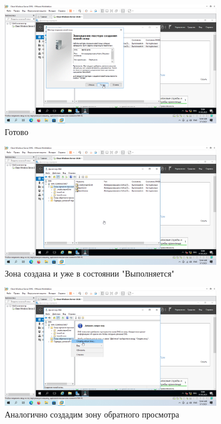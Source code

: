 \documentclass[a4paper]{article}
\begin{document}
  \begin{figure}[H]
    \centering
    \includegraphics[width=0.85\textwidth]{9_0075}
    \caption{Готово}
    \label{img:0075}
  \end{figure}

  \begin{figure}[H]
    \centering
    \includegraphics[width=0.85\textwidth]{9_0076}
    \caption{Зона создана и уже в состоянии "Выполняется"}
    \label{img:0076}
  \end{figure}

  \begin{figure}[H]
    \centering
    \includegraphics[width=0.85\textwidth]{9_0077}
    \caption{Аналогично создадим зону обратного просмотра}
    \label{img:0077}
  \end{figure}
\end{document}
